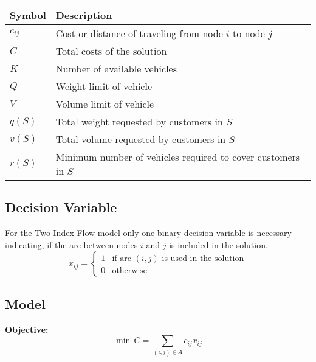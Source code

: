 \begin{table}[ht]
    \centering
    \begin{tabular}{ll}
        \toprule
        Symbol   & Description                                                   \\
        \midrule
        $c_{ij}$ & Cost or distance of traveling from node $i$ to node $j$       \\
        $C$      & Total costs of the solution                                   \\
        $K$      & Number of available vehicles                                  \\
        $Q$      & Weight limit of vehicle                                       \\
        $V$      & Volume limit of vehicle                                       \\
        $q(S)$   & Total weight requested by customers in $S$                    \\
        $v(S)$   & Total volume requested by customers in $S$                    \\
        $r(S)$   & Minimum number of vehicles required to cover customers in $S$ \\
        \bottomrule
    \end{tabular}
\end{table}

\bigskip

\subsection*{Decision Variable}
For the Two-Index-Flow model only one binary decision variable is necessary indicating, if the arc
between nodes $i$ and $j$ is included in the solution.
\[
    x_{ij} =
    \begin{cases}
        1 & \text{if arc } (i,j) \text{ is used in the solution} \\
        0 & \text{otherwise}
    \end{cases}
\]

\bigskip

\subsection*{Model}
\textbf{Objective:}
\begin{equation}
    \label{eq:objective}
    \min \, C = \sum_{(i,j)\in A} c_{ij}x_{ij}
\end{equation}

